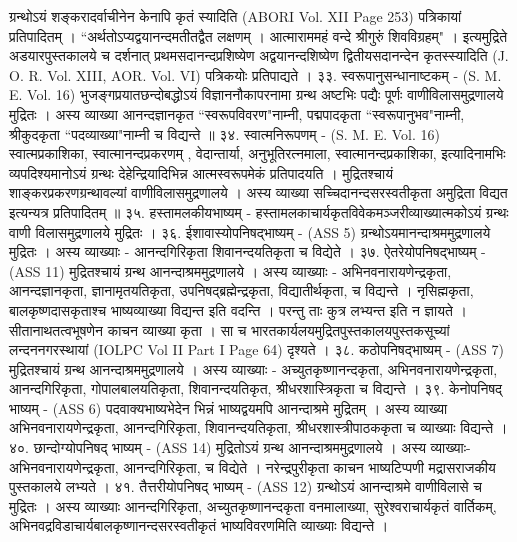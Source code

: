 ग्रन्थोऽयं शङ्करादर्वाचीनेन केनापि कृतं स्यादिति (ABORI Vol. XII Page 253) पत्रिकायां प्रतिपादितम् । ``अर्थतोऽप्यद्वयानन्दमतीतद्वैत लक्षणम् । आत्माराममहं वन्दे श्रीगुरुं शिवविग्रहम्" । इत्यमुद्रिते अडयारपुस्तकालये च दर्शनात् प्रथमसदानन्दप्रशिष्येण अद्वयानन्दशिष्येण द्वितीयसदानन्देन कृतस्स्यादिति (J. O. R. Vol. XIII, AOR. Vol. VI) पत्रिकयोः प्रतिपाद्यते ।
३३. स्वरूपानुसन्धानाष्टकम् - (S. M. E. Vol. 16)
भुजङ्गप्रयातछन्दोबद्धोऽयं विज्ञाननौकापरनामा ग्रन्थ अष्टभिः पद्यैः पूर्णः वाणीविलासमुद्रणालये मुद्रितः । अस्य व्याख्या आनन्दज्ञानकृत ``स्वरूपविवरण"नाम्नी, पद्मपादकृता ``स्वरूपानुभव"नाम्नी, श्रीकुदकृता ``पदव्याख्या"नाम्नी च विद्यन्ते ॥
३४. स्वात्मनिरूपणम् - (S. M. E. Vol. 16)
स्वात्मप्रकाशिका, स्वात्मानन्दप्रकरणम् , वेदान्तार्या, अनुभूतिरत्नमाला, स्वात्मानन्दप्रकाशिका, इत्यादिनामभिः व्यपदिश्यमानोऽयं ग्रन्थः देहेन्द्रियादिभिन्न आत्मस्वरूपमेकं प्रतिपादयति । मुद्रितश्चायं शाङ्करप्रकरणग्रन्थावल्यां वाणीविलासमुद्रणालये । अस्य व्याख्या सच्चिदानन्दसरस्वतीकृता अमुद्रिता विद्यत इत्यन्यत्र प्रतिपादितम् ॥
३५. हस्तामलकीयभाष्यम् -
हस्तामलकाचार्यकृतविवेकमञ्जरीव्याख्यात्मकोऽयं ग्रन्थः वाणी विलासमुद्रणालये मुद्रितः ।
३६. ईशावास्योपनिषद्भाष्यम् - (ASS 5)
ग्रन्थोऽयमानन्दाश्रममुद्रणालये मुद्रितः । अस्य व्याख्याः - आनन्दगिरिकृता शिवानन्दयतिकृता च विद्येते ।
३७. ऐतरेयोपनिषद्भाष्यम् - (ASS 11)
मुद्रितश्चायं ग्रन्थ आनन्दाश्रममुद्रणालये । अस्य व्याख्याः - अभिनवनारायणेन्द्रकृता, आनन्दज्ञानकृता, ज्ञानामृतयतिकृता, उपनिषद्ब्रह्मेन्द्रकृता, विद्यातीर्थकृता, च विद्यन्ते । नृसिह्मकृता, बालकृष्णदासकृताश्च भाष्यव्याख्या विद्यन्त इति वदन्ति । परन्तु ताः कुत्र लभ्यन्त इति न ज्ञायते । सीतानाथतत्वभूषणेन काचन व्याख्या कृता । सा च भारतकार्यलयमुद्रितपुस्तकालयपुस्तकसूच्यां लन्दननगरस्थायां (IOLPC Vol II Part I Page 64) दृश्यते ।
३८. कठोपनिषद्भाष्यम् - (ASS 7)
मुद्रितश्चायं ग्रन्थ आनन्दाश्रममुद्रणालये । अस्य व्याख्याः - अच्युतकृष्णानन्दकृता, अभिनवनारायणेन्द्रकृता, आनन्दगिरिकृता, गोपालबालयतिकृता, शिवानन्दयतिकृत, श्रीधरशास्त्रिकृता च विद्यन्ते ।
३९. केनोपनिषद् भाष्यम् - (ASS 6)
पदवाक्यभाष्यभेदेन भिन्नं भाष्यद्वयमपि आनन्दाश्रमे मुद्रितम् । अस्य व्याख्या अभिनवनारायणेन्द्रकृता, आनन्दगिरिकृता, शिवानन्दयतिकृता, श्रीधरशास्त्रीपाठककृता च व्याख्याः विद्यन्ते ।
४०. छान्दोग्योपनिषद् भाष्यम् - (ASS 14)
मुद्रितोऽयं ग्रन्थ आनन्दाश्रममुद्रणालये । अस्य व्याख्याः-अभिनवनारायणेन्द्रकृता, आनन्दगिरिकृता, च विद्येते । नरेन्द्रपुरीकृता काचन भाष्यटिप्पणी मद्रासराजकीय पुस्तकालये लभ्यते ।
४१. तैत्तरीयोपनिषद् भाष्यम् - (ASS 12)
ग्रन्थोऽयं आनन्दाश्रमे वाणीविलासे च मुद्रितः । अस्य व्याख्याः आनन्दगिरिकृता, अच्युतकृष्णानन्दकृता वनमालाख्या, सुरेश्वराचार्यकृतं वार्तिकम्, अभिनवद्रविडाचार्यबालकृष्णानन्दसरस्वतीकृतं भाष्यविवरणमिति व्याख्याः विद्यन्ते ।
